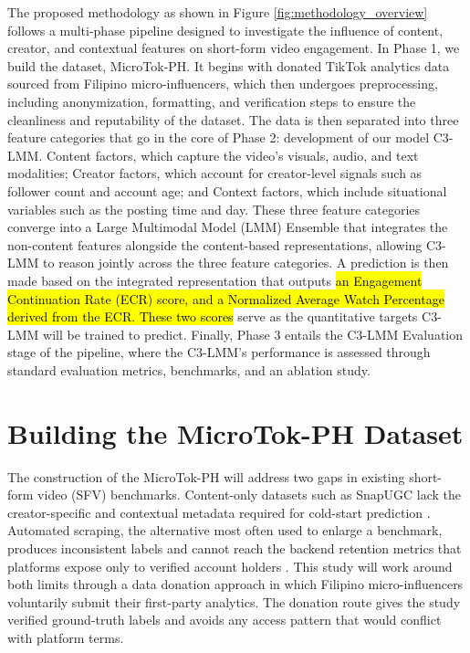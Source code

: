 The proposed methodology as shown in Figure \ref{fig:methodology_overview} follows a multi-phase pipeline designed to investigate the influence of content, creator, and contextual features on short-form video engagement. In Phase 1, we build the dataset, MicroTok-PH. It begins with donated TikTok analytics data sourced from Filipino micro-influencers, which then undergoes preprocessing, including anonymization, formatting, and verification steps to ensure the cleanliness and reputability of the dataset. The data is then separated into three feature categories that go in the core of Phase 2: development of our model C3-LMM. Content factors, which capture the video's visuals, audio, and text modalities; Creator factors, which account for creator-level signals such as follower count and account age; and Context factors, which include situational variables such as the posting time and day. These three feature categories converge into a Large Multimodal Model (LMM) Ensemble that integrates the non-content features alongside the content-based representations, allowing C3-LMM to reason jointly across the three feature categories. A prediction is then made based on the integrated representation that outputs \hl{an Engagement Continuation Rate (ECR) score, and a Normalized Average Watch Percentage derived from the ECR. These two scores} serve as the quantitative targets C3-LMM will be trained to predict. Finally, Phase 3 entails the C3-LMM Evaluation stage of the pipeline, where the C3-LMM's performance is assessed through standard evaluation metrics, benchmarks, and an ablation study.


\section{Building the MicroTok-PH Dataset}

The construction of the MicroTok-PH will address two gaps in existing short-form video (SFV) benchmarks. Content-only datasets such as SnapUGC lack the creator-specific and contextual metadata required for cold-start prediction \cite{li2024delving}. Automated scraping, the alternative most often used to enlarge a benchmark, produces inconsistent labels and cannot reach the backend retention metrics that platforms expose only to verified account holders \cite{li2025vquala}. This study will work around both limits through a data donation approach in which Filipino micro-influencers voluntarily submit their first-party analytics. The donation route gives the study verified ground-truth labels and avoids any access pattern that would conflict with platform terms.

